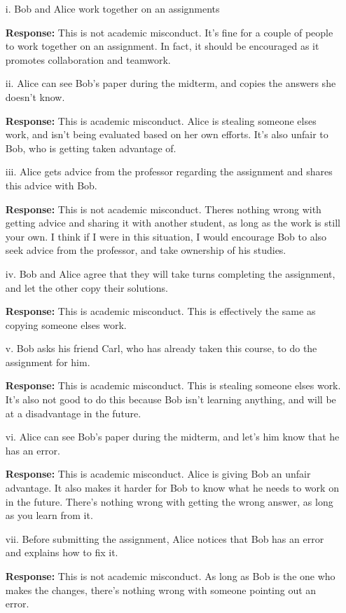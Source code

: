\documentclass{article}
\begin{document}
\begin{itemize}
    \item[i.] Bob and Alice work together on an assignments
    \item[] \textbf{Response:} This is not academic misconduct. It's fine for a couple of people to work
    together on an assignment. In fact, it should be encouraged as it promotes collaboration and teamwork.
    \item[ii.] Alice can see Bob's paper during the midterm, and copies the answers she doesn't know. 
    \item[] \textbf{Response:} This is academic misconduct. Alice is stealing someone elses work, and isn't 
    being evaluated based on her own efforts. It's also unfair to Bob, who is getting taken advantage of.
    \item[iii.] Alice gets advice from the professor regarding the assignment and shares this
    advice with Bob.
    \item[] \textbf{Response:} This is not academic misconduct. Theres nothing wrong with getting advice and sharing it with 
    another student, as long as the work is still your own. I think if I were in this situation, I would encourage Bob to 
    also seek advice from the professor, and take ownership of his studies. 
    \item[iv.]  Bob and Alice agree that they will take turns completing the assignment,
    and let the other copy their solutions.
    \item[] \textbf{Response:} This is academic misconduct. This is effectively the same as copying someone elses work.
    \item[v.] Bob asks his friend Carl, who has already taken this course, to do the assignment for him.
    \item[] \textbf{Response:} This is academic misconduct. This is stealing someone elses work. It's also not good to do this because
    Bob isn't learning anything, and will be at a disadvantage in the future.
    \item[vi.]  Alice can see Bob's paper during the midterm, and let's him know that he
    has an error.
    \item[] \textbf{Response:} This is academic misconduct. Alice is giving Bob an unfair advantage. It also makes it harder for Bob to know 
    what he needs to work on in the future. There's nothing wrong with getting the wrong answer, as long as you learn from it.
    \item[vii.]  Before submitting the assignment, Alice notices that Bob has an error and
    explains how to fix it.
    \item[] \textbf{Response:} This is not academic misconduct. As long as Bob is the one who makes the changes, there's nothing wrong with someone 
    pointing out an error.
\end{itemize}
\end{document}
